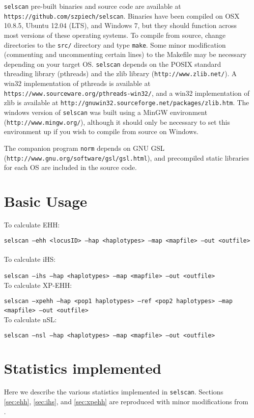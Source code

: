 \documentclass[12pt]{article}%
\begin{document}
{\tt selscan} pre-built binaries and source code are available at {\tt https://github.com/szpiech/selscan}.  Binaries have been compiled on OSX 10.8.5, Ubuntu 12.04 (LTS), and Windows 7, but they should function across most versions of these operating systems.  To compile from source, change directories to the {\tt src/} directory and type {\tt make}.  Some minor modification (commenting and uncommenting certain lines) to the Makefile may be necessary depending on your target OS.  {\tt selscan} depends on the POSIX standard threading library (pthreads) and the zlib library ({\tt http://www.zlib.net/}). A win32 implementation of pthreads is available at {\tt https://www.sourceware.org/pthreads-win32/}, and a win32 implementation of zlib is available at {\tt http://gnuwin32.sourceforge.net/packages/zlib.htm}.  The windows version of {\tt selscan} was built using a MinGW environment ({\tt http://www.mingw.org/}), although it should only be necessary to set this environment up if you wish to compile from source on Windows.

The companion program {\tt norm} depends on GNU GSL ({\tt http://www.gnu.org/software/gsl/gsl.html}), and precompiled static libraries for each OS are included in the source code.

\section{Basic Usage}

To calculate EHH:

{\tt selscan --ehh <locusID> --hap <haplotypes> --map <mapfile> --out <outfile>}
~\\
\noindent To calculate iHS:

{\tt selscan --ihs --hap <haplotypes> --map <mapfile> --out <outfile>}
~\\
\noindent To calculate XP-EHH:

{\tt selscan --xpehh --hap <pop1 haplotypes> --ref <pop2 haplotypes> --map <mapfile> --out <outfile>}
~\\
\noindent To calculate nSL:

{\tt selscan --nsl --hap <haplotypes> --map <mapfile> --out <outfile>}

\section{Statistics implemented}

Here we describe the various statistics implemented in {\tt selscan}.  Sections 
\ref{sec:ehh}, \ref{sec:ihs}, and \ref{sec:xpehh} are reproduced with minor modifications from 
\cite{SzpiechAndHernandez14}.
\end{document}
